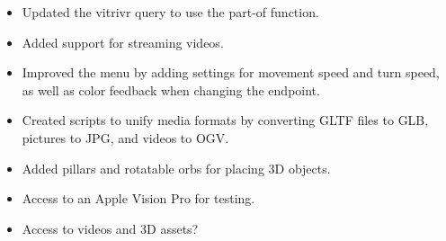 \documentclass{article}
\begin{document}
\done
\begin{itemize}
    \item Updated the vitrivr query to use the part-of function.
    \item Added support for streaming videos.
    \item Improved the menu by adding settings for movement speed and turn speed, as well as color feedback when changing the endpoint.
    \item Created scripts to unify media formats by converting GLTF files to GLB, pictures to JPG, and videos to OGV.
    \item Added pillars and rotatable orbs for placing 3D objects.
\end{itemize}

\support
\begin{itemize}
    \item Access to an Apple Vision Pro for testing.
    \item Access to videos and 3D assets?
\end{itemize}

\plan
{}
\end{document}
